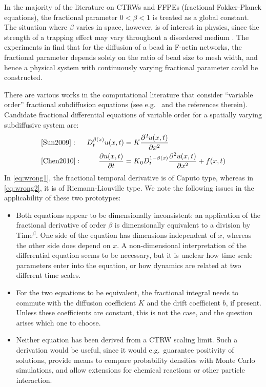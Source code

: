 \documentclass[a4paper,12pt]{elsarticle}
\numberwithin{equation}{section}
\theoremstyle{plain}
\theoremstyle{definition}
\theoremstyle{remark}
\numberwithin{equation}{section}
\newcommand{\1}{\mathbf 1}
\begin{document}
In the majority of the literature on CTRWs and FFPEs (fractional Fokker-Planck
equations), the
fractional parameter $0 < \beta < 1$ is treated as a global constant.  The
situation where $\beta$ varies in space, however, is of interest in physics,
since the strength of a trapping effect may vary throughout a disordered
medium
\cite{Chechkin2005a,Korabel2010,Stickler2011,Fedotov2012,StrakaFedotov14}.
The experiments in \cite{Wong04} find that for the diffusion of a bead in
F-actin networks, the fractional parameter depends solely on the ratio of
bead size to mesh width, and hence a physical system with continuously varying
fractional parameter could be constructed.

There are various works in the computational literature that consider ``variable
order'' fractional subdiffusion equations (see e.g.\ \cite{Chen2010,Sun2009} and
the references therein). Candidate fractional differential equations of
variable order for a spatially varying subdiffusive system are:
\begin{align}
\label{eq:wrong1}
  &\cite[Eq.(8)]{Sun2009}:
  &
  D_t^{\beta(x)} u(x,t) &= K \frac{\partial^2 u(x,t)}{\partial x^2}
  \\
  \label{eq:wrong2}
  &\cite[Eq.(1.2)]{Chen2010}:
  &
  \frac{\partial u(x,t)}{\partial t} &= K {_0 D_t^{1-\beta(x)}}
  \frac{\partial^2 u(x,t)}{\partial x^2} + f(x,t)
\end{align}
In \eqref{eq:wrong1}, the fractional temporal derivative is of Caputo type,
whereas in \eqref{eq:wrong2}, it is of Riemann-Liouville type.
We note the following issues in the applicability of these two prototypes:
\begin{itemize}
  \item
  Both equations appear to be dimensionally inconsistent: an application of the
  fractional derivative of order $\beta$ is dimensionally equivalent to a
  division by Time$^{\beta}$. One side of the equation has dimensions
  independent of $x$, whereas the other side does depend on $x$.  A
  non-dimensional interpretation of the differential equation seems to be
  necessary, but it is unclear how time scale parameters enter into the
  equation, or how dynamics are related at two different time scales.
  \item
  For the two equations to be equivalent, the fractional integral needs to
  commute with the diffusion coefficient $K$ and the drift coefficient $b$,
  if present.  Unless these coefficients are constant, this is not the case,
  and the question arises which one to choose.
  \item
  Neither equation has been derived from a CTRW scaling limit. Such a derivation
  would be useful, since it would e.g.\ guarantee positivity of solutions,
  provide means to compare probability densities with Monte Carlo simulations,
  and allow extensions for chemical reactions or other particle interaction.
\end{itemize}
\end{document}
